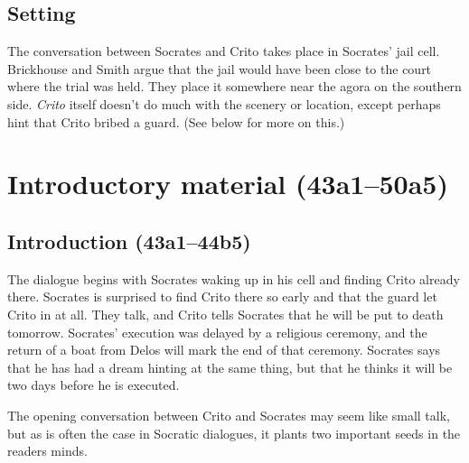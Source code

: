 \documentclass[12pt,letterpaper]{article}
\begin{document}

\subsection*{Setting}

The conversation between Socrates and Crito takes place in Socrates' jail cell. Brickhouse and Smith argue that the jail would have been close to the court where the trial was held.\smartcite[][197]{brickhouse-smith2004-plato-trial-of-socrates} They place it somewhere near the agora on the southern side. \textit{Crito} itself doesn't do much with the scenery or location, except perhaps hint that Crito bribed a guard. (See below for more on this.)



\section*{Introductory material (43a1--50a5)}

\subsection*{Introduction (43a1--44b5)}

The dialogue begins with Socrates waking up in his cell and finding Crito already there. Socrates is surprised to find Crito there so early and that the guard let Crito in at all. They talk, and Crito tells Socrates that he will be put to death tomorrow. Socrates' execution was delayed by a religious ceremony, and the return of a boat from Delos will mark the end of that ceremony. Socrates says that he has had a dream hinting at the same thing, but that he thinks it will be two days before he is executed.

The opening conversation between Crito and Socrates may seem like small talk, but as is often the case in Socratic dialogues, it plants two important seeds in the readers minds.
\end{document}
